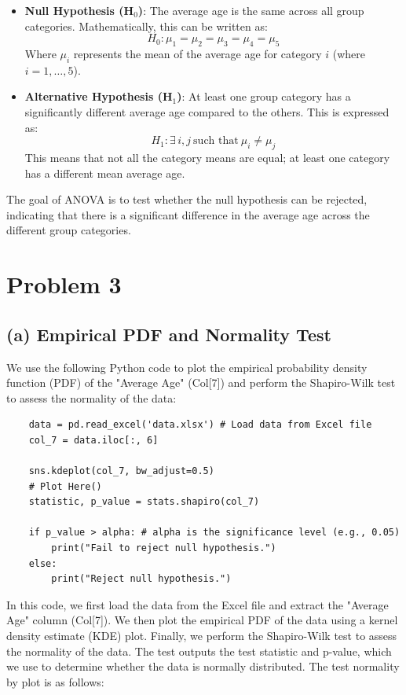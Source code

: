 \documentclass[12pt]{article}
\begin{document}
\begin{itemize}
    \item \textbf{Null Hypothesis (H$_0$)}: The average age is the same across all group categories. Mathematically, this can be written as:
    \[
    H_0: \mu_1 = \mu_2 = \mu_3 = \mu_4 = \mu_5
    \]
    Where $\mu_i$ represents the mean of the average age for category $i$ (where $i = 1, \dots, 5$).
    
    \item \textbf{Alternative Hypothesis (H$_1$)}: At least one group category has a significantly different average age compared to the others. This is expressed as:
    \[
    H_1: \exists \, i, j \ \text{such that} \ \mu_i \neq \mu_j
    \]
    This means that not all the category means are equal; at least one category has a different mean average age.
\end{itemize}

The goal of ANOVA is to test whether the null hypothesis can be rejected, indicating that there is a significant difference in the average age across the different group categories.


\section*{Problem 3}

\subsection*{(a) Empirical PDF and Normality Test}

We use the following Python code to plot the empirical probability density function (PDF) of the "Average Age" (Col[7]) and perform the Shapiro-Wilk test to assess the normality of the data:

\begin{verbatim}
    data = pd.read_excel('data.xlsx') # Load data from Excel file
    col_7 = data.iloc[:, 6]  

    sns.kdeplot(col_7, bw_adjust=0.5)
    # Plot Here()
    statistic, p_value = stats.shapiro(col_7) 

    if p_value > alpha: # alpha is the significance level (e.g., 0.05)
        print("Fail to reject null hypothesis.")
    else:
        print("Reject null hypothesis.")

\end{verbatim}

In this code, we first load the data from the Excel file and extract the "Average Age" column (Col[7]). We then plot the empirical PDF of the data using a kernel density estimate (KDE) plot. Finally, we perform the Shapiro-Wilk test to assess the normality of the data. The test outputs the test statistic and p-value, which we use to determine whether the data is normally distributed. The test normality by plot is as follows:
\end{document}
